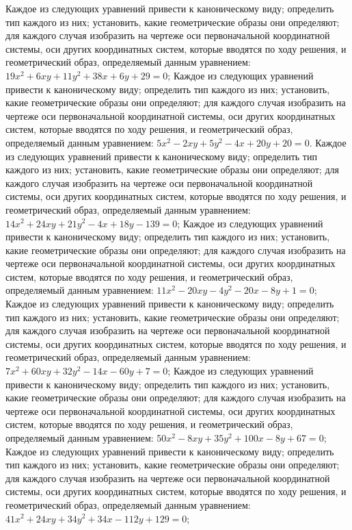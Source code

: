 Каждое из следующих уравнений привести к каноническому виду; определить тип каждого из них; установить, какие геометрические образы они определяют; для каждого случая изобразить на чертеже оси первоначальной координатной системы, оси других координатных систем, которые вводятся по ходу решения, и геометрический образ, определяемый данным уравнением: $19 x^2+6 x y+11 y^2+38 x+6 y+29=0$;
Каждое из следующих уравнений привести к каноническому виду; определить тип каждого из них; установить, какие геометрические образы они определяют; для каждого случая изобразить на чертеже оси первоначальной координатной системы, оси других координатных систем, которые вводятся по ходу решения, и геометрический образ, определяемый данным уравнением: $5 x^2-2 x y+5 y^2-4 x+20 y+20=0$.
Каждое из следующих уравнений привести к каноническому виду; определить тип каждого из них; установить, какие геометрические образы они определяют; для каждого случая изобразить на чертеже оси первоначальной координатной системы, оси других координатных систем, которые вводятся по ходу решения, и геометрический образ, определяемый данным уравнением: $14 x^2+24 x y+21 y^2-4 x+18 y-139=0$;
Каждое из следующих уравнений привести к каноническому виду; определить тип каждого из них; установить, какие геометрические образы они определяют; для каждого случая изобразить на чертеже оси первоначальной координатной системы, оси других координатных систем, которые вводятся по ходу решения, и геометрический образ, определяемый данным уравнением: $11 x^2-20 x y-4 y^2-20 x-8 y+1=0$;
Каждое из следующих уравнений привести к каноническому виду; определить тип каждого из них; установить, какие геометрические образы они определяют; для каждого случая изобразить на чертеже оси первоначальной координатной системы, оси других координатных систем, которые вводятся по ходу решения, и геометрический образ, определяемый данным уравнением: $7 x^2+60 x y+32 y^2-14 x-60 y+7=0$;
Каждое из следующих уравнений привести к каноническому виду; определить тип каждого из них; установить, какие геометрические образы они определяют; для каждого случая изобразить на чертеже оси первоначальной координатной системы, оси других координатных систем, которые вводятся по ходу решения, и геометрический образ, определяемый данным уравнением: $50 x^2-8 x y+35 y^2+100 x-8 y+67=0$;
Каждое из следующих уравнений привести к каноническому виду; определить тип каждого из них; установить, какие геометрические образы они определяют; для каждого случая изобразить на чертеже оси первоначальной координатной системы, оси других координатных систем, которые вводятся по ходу решения, и геометрический образ, определяемый данным уравнением: $41 x^2+24 x y+34 y^2+34 x-112 y+129=0$;
